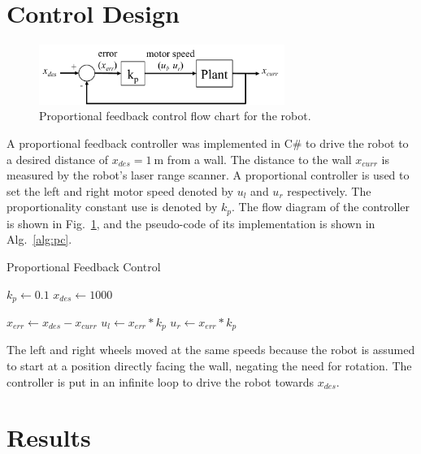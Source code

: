 \documentclass[conference]{../IEEEtran}
\begin{document}
\section{Control Design}
%
\begin{figure}[h]
  \centering
  \includegraphics[width = 8cm]{figures/ControlDiagram}
  \caption{Proportional feedback control flow chart for the robot.}
  \label{fig:control}
\end{figure}
%
A proportional feedback controller was implemented in C\# to drive the robot to a desired
distance of $x_{des} =\SI{1}{\meter}$ from a wall. The distance to the wall
$x_{curr}$ is measured by the robot's laser range scanner. A proportional controller
is used to set the left and right motor speed denoted by $u_l$ and $u_r$ respectively. The
proportionality constant use is denoted by $k_p$. The flow diagram of the controller is
shown in Fig.~\ref{fig:control}, and the pseudo-code of its implementation is shown in
Alg.~\ref{alg:pc}.
%
\begin{algorithm}[b]
  \caption{Proportional Feedback Control}
  \begin{algorithmic}[1]
    \State $k_p \gets 0.1$
    \State $x_{des} \gets 1000$

    \medskip
    \State $x_{err} \gets x_{des}-x_{curr}$
    \medskip
    \State $u_l \gets x_{err} * k_{p}$
    \State $u_r \gets x_{err} * k_{p}$
    \EndWhile{}

    \end{algorithmic}
  \label{alg:pc}
\end{algorithm}

The left and right wheels moved at the same speeds because the robot is assumed to start
at a position directly facing the wall, negating the need for rotation. The controller is
put in an infinite loop to drive the robot towards $x_{des}$.

\addtolength{\textheight}{-14cm}

\section{Results}
\end{document}
